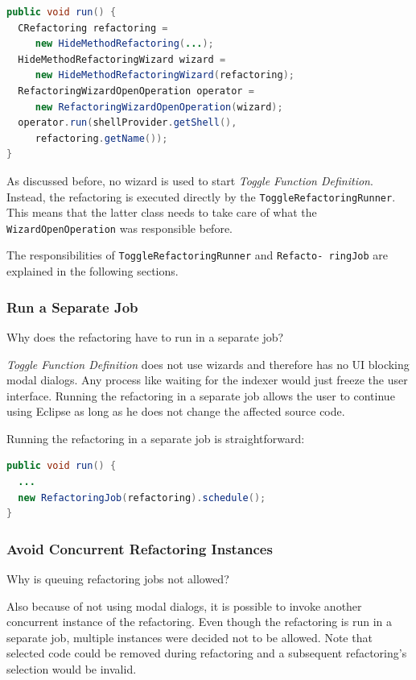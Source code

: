 \begin{lstlisting}[caption={shorted run method of HideMethodRefactoringRunner},label={wizardRun}, language=Java]
public void run() {
  CRefactoring refactoring = 
     new HideMethodRefactoring(...);
  HideMethodRefactoringWizard wizard = 
     new HideMethodRefactoringWizard(refactoring);
  RefactoringWizardOpenOperation operator = 
     new RefactoringWizardOpenOperation(wizard);
  operator.run(shellProvider.getShell(), 
     refactoring.getName());
}
\end{lstlisting}

As discussed before, no wizard is used to start \textit{Toggle Function 
Definition}. Instead, the refactoring is executed directly by the 
\texttt{ToggleRefactoringRunner}. This means that the latter class needs to take 
care of what the \texttt{WizardOpenOperation} was responsible before.

The responsibilities of \texttt{ToggleRefactoringRunner} and 
\texttt{Refacto- ringJob} are explained in the following sections.

\subsubsection{Run a Separate Job}
Why does the refactoring have to run in a separate job?

\textit{Toggle Function Definition} does not use wizards and therefore 
has no UI blocking modal dialogs. Any process like waiting for the indexer would 
just freeze the user interface. Running the refactoring in a separate job 
allows the user to continue using Eclipse as long as he does not change the 
affected source code.

Running the refactoring in a separate job is straightforward:
\begin{lstlisting}[caption={ToggleRefactoringRunner starting the job},
label={jobstart}, language=Java]
public void run() {
  ...
  new RefactoringJob(refactoring).schedule();
}
\end{lstlisting}

\subsubsection{Avoid Concurrent Refactoring Instances}
Why is queuing refactoring jobs not allowed?

Also because of not using modal dialogs, it is possible to invoke another 
concurrent instance of the refactoring. Even though the refactoring is run 
in a separate job, multiple instances were decided not to be allowed. Note 
that selected code could be removed during refactoring and a subsequent 
refactoring's selection would be invalid.

